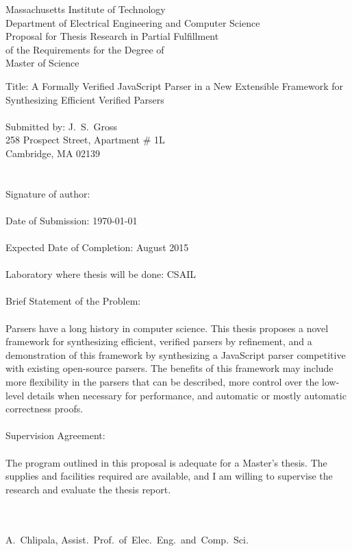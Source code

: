\documentclass{article}
\begin{document}
\thispagestyle{empty}
\begin{center}
Massachusetts Institute of Technology \\
Department of Electrical Engineering and Computer Science \\ $\left.\right.$ \\
Proposal for Thesis Research in Partial Fulfillment \\
of the Requirements for the Degree of \\
Master of Science
\end{center}
\noindent Title: A Formally Verified JavaScript Parser in a New Extensible Framework for Synthesizing Efficient Verified Parsers \\ \\
Submitted by: J.~S.~Gross \\
\phantom{Submitted by: }258 Prospect Street, Apartment \# 1L \\
\phantom{Submitted by: }Cambridge, MA 02139 \\ \\ \\
Signature of author: \underline{\hspace{20em}} \\ \\
Date of Submission: \today \\ \\
Expected Date of Completion: August 2015 \\ \\
Laboratory where thesis will be done: CSAIL \\ \\
Brief Statement of the Problem: \\ \\
Parsers have a long history in computer science.  This thesis proposes a novel framework for synthesizing efficient, verified parsers by refinement, and a demonstration of this framework by synthesizing a JavaScript parser competitive with existing open-source parsers.  The benefits of this framework may include more flexibility in the parsers that can be described, more control over the low-level details when necessary for performance, and automatic or mostly automatic correctness proofs. \\ \\
Supervision Agreement: \\ \\
The program outlined in this proposal is adequate for a Master's thesis. The supplies and facilities
required are available, and I am willing to supervise the research and evaluate the thesis report. \\ \\
\begin{flushright}
\underline{\hspace*{25em}} \\ $\left.\right.$ \\
A.~Chlipala, Assist.~Prof.~of~Elec.~Eng.~and~Comp.~Sci.
\end{flushright}
\clearpage
$\left.\right.$
\clearpage
\end{document}
